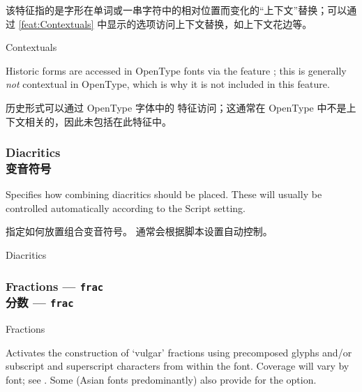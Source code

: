 \documentclass[a4paper]{l3doc}
\begin{document}
该特征指的是字形在单词或一串字符中的相对位置而变化的“上下文”替换；可以通过 \ref{feat:Contextuals} 中显示的选项访问上下文替换，如上下文花边等。

\begin{features}{Contextuals}
\end{features}

Historic forms are accessed in OpenType
fonts via the feature ; this is generally \emph{not}
contextual in OpenType, which is why it is not included in this feature.

历史形式可以通过 OpenType 字体中的  特征访问；这通常在 OpenType 中不是上下文相关的，因此未包括在此特征中。

\subsubsection{Diacritics\\变音符号}

Specifies how combining diacritics should be placed.
These will usually be controlled automatically
according to the Script setting.

指定如何放置组合变音符号。
通常会根据脚本设置自动控制。

\begin{features}{Diacritics}
\end{features}


\subsubsection{Fractions --- \texttt{frac}\\分数 --- \texttt{frac}}

\begin{features}{Fractions}
\end{features}

Activates the construction of `vulgar' fractions using precomposed glyphs and/or
subscript and superscript characters from within the font.
Coverage will vary by font; see .
Some (Asian fonts predominantly) also provide for the  option.
\end{document}
